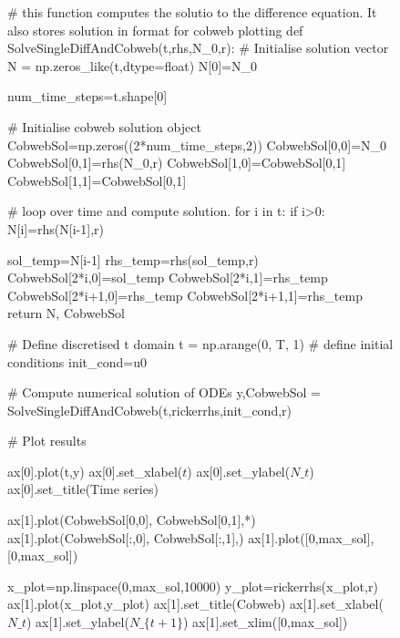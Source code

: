 \documentclass[
  letterpaper,
  DIV=11,
  numbers=noendperiod]{scrreprt}
\newenvironment{Shaded}{\begin{snugshade}}{\end{snugshade}}
\newcommand{\NormalTok}[1]{\textcolor[rgb]{0.00,0.23,0.31}{#1}}
\begin{document}
\begin{figure}
{\begin{Shaded}
\begin{Highlighting}[]
\NormalTok{        \# this function computes the solutio to the difference equation. It also stores solution in format for cobweb plotting}
\NormalTok{        def SolveSingleDiffAndCobweb(t,rhs,N\_0,r):}
\NormalTok{          \# Initialise solution vector}
\NormalTok{          N = np.zeros\_like(t,dtype=float)}
\NormalTok{          N[0]=N\_0}


\NormalTok{          num\_time\_steps=t.shape[0]}


\NormalTok{          \# Initialise cobweb solution object}
\NormalTok{          CobwebSol=np.zeros((2*num\_time\_steps,2))}
\NormalTok{          CobwebSol[0,0]=N\_0}
\NormalTok{          CobwebSol[0,1]=rhs(N\_0,r)}
\NormalTok{          CobwebSol[1,0]=CobwebSol[0,1]}
\NormalTok{          CobwebSol[1,1]=CobwebSol[0,1]}

\NormalTok{          \# loop over time and compute solution.}
\NormalTok{          for i in t:}
\NormalTok{            if i\textgreater{}0:}
\NormalTok{              N[i]=rhs(N[i{-}1],r) }

\NormalTok{              sol\_temp=N[i{-}1]}
\NormalTok{              rhs\_temp=rhs(sol\_temp,r)}
\NormalTok{              CobwebSol[2*i,0]=sol\_temp}
\NormalTok{              CobwebSol[2*i,1]=rhs\_temp}
\NormalTok{              CobwebSol[2*i+1,0]=rhs\_temp}
\NormalTok{              CobwebSol[2*i+1,1]=rhs\_temp}
\NormalTok{          return N, CobwebSol}

\NormalTok{        \# Define discretised t domain}
\NormalTok{        t = np.arange(0, T, 1)}
\NormalTok{        \# define initial conditions}
\NormalTok{        init\_cond=u0}
        
\NormalTok{        \# Compute numerical solution of ODEs}
\NormalTok{        y,CobwebSol = SolveSingleDiffAndCobweb(t,rickerrhs,init\_cond,r)}

\NormalTok{        \# Plot results}
        
\NormalTok{        ax[0].plot(t,y)}
\NormalTok{        ax[0].set\_xlabel(\textquotesingle{}$t$\textquotesingle{})}
\NormalTok{        ax[0].set\_ylabel(\textquotesingle{}$N\_t$\textquotesingle{})}
\NormalTok{        ax[0].set\_title(\textquotesingle{}Time series\textquotesingle{})}


\NormalTok{        ax[1].plot(CobwebSol[0,0], CobwebSol[0,1],\textquotesingle{}*\textquotesingle{})}
\NormalTok{        ax[1].plot(CobwebSol[:,0], CobwebSol[:,1],\textquotesingle{}{-}\textquotesingle{})}
\NormalTok{        ax[1].plot([0,max\_sol],[0,max\_sol])}

\NormalTok{        x\_plot=np.linspace(0,max\_sol,10000)}
\NormalTok{        y\_plot=rickerrhs(x\_plot,r)}
\NormalTok{        ax[1].plot(x\_plot,y\_plot)}
\NormalTok{        ax[1].set\_title(\textquotesingle{}Cobweb\textquotesingle{})}
\NormalTok{        ax[1].set\_xlabel(\textquotesingle{}$N\_t$\textquotesingle{})}
\NormalTok{        ax[1].set\_ylabel(\textquotesingle{}$N\_\{t+1\}$\textquotesingle{})}
\NormalTok{        ax[1].set\_xlim([0,max\_sol])}


\end{Highlighting}
\end{Shaded}}
\end{figure}
\end{document}
